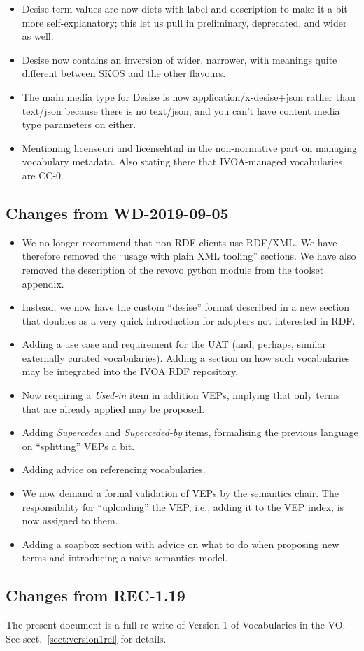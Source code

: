 \documentclass[11pt,a4paper]{ivoa}
\begin{document}
\begin{itemize}
\item Desise term values are now dicts with label and description to
make it a bit more self-explanatory; this let us pull in preliminary,
deprecated, and wider as well.
\item Desise now contains an inversion of wider, narrower, with meanings
quite different between SKOS and the other flavours.
\item The main media type for Desise is now application/x-desise+json rather 
than text/json because there is no text/json, and you can't have
content media type parameters on either.
\item Mentioning licenseuri and licensehtml in the non-normative part on
managing vocabulary metadata. Also stating there that IVOA-managed
vocabularies are CC-0.
\end{itemize}


\subsection{Changes from WD-2019-09-05}

\begin{itemize}
\item We no longer recommend that non-RDF clients use RDF/XML.  We have
therefore removed the ``usage with plain XML tooling'' sections.  We
have also removed the description of the revovo python module from the
toolset appendix.

\item Instead, we now have the custom ``desise'' format described in a
new section that doubles as a very quick introduction for adopters not
interested in RDF.

\item Adding a use case and requirement for the UAT (and, perhaps,
similar externally curated vocabularies).  Adding a section on how
such vocabularies may be integrated into the IVOA RDF repository.

\item Now requiring a \emph{Used-in} item in addition VEPs, implying
that only terms that are already applied may be proposed.

\item Adding \emph{Supercedes} and \emph{Superceded-by} items,
formalising the previous language on ``splitting'' VEPs a bit.

\item Adding advice on referencing vocabularies.

\item We now demand a formal validation of VEPs by the semantics chair.
The responsibility for ``uploading'' the VEP, i.e., adding it to the VEP
index, is now assigned to them.

\item Adding a soapbox section with advice on what to do when proposing
new terms and introducing a naive semantics model.
\end{itemize}

\subsection{Changes from REC-1.19}

The present document is a full re-write of Version 1 of Vocabularies in
the VO.  See sect.~\ref{sect:version1rel} for details.


\end{document}
